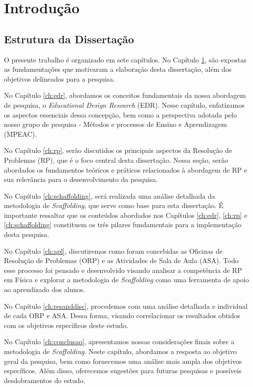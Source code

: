 \chapter{Introdução}\label{ch:intro}

\section{Estrutura da Dissertação}

O presente trabalho é organizado em sete capítulos. No Capítulo \ref{ch:intro}, são expostas as fundamentações que motivaram a elaboração desta dissertação, além dos objetivos delineados para a pesquisa.

No Capítulo \ref{ch:edr}, abordamos os conceitos fundamentais da nossa abordagem de pesquisa, o \textit{Educational Design Research} (EDR). Nesse capítulo, enfatizamos os aspectos essenciais dessa concepção, bem como a perspectiva adotada pelo nosso grupo de pesquisa - Métodos e processos de Ensino e Aprendizagem (MPEAC).

No Capítulo \ref{ch:rp}, serão discutidos os principais aspectos da Resolução de Problemas (RP), que é o foco central desta dissertação. Nessa seção, serão abordados os fundamentos teóricos e práticos relacionados à abordagem de RP e sua relevância para o desenvolvimento da pesquisa.

No Capítulo \ref{ch:schaffolding}, será realizada uma análise detalhada da metodologia de \textit{Scaffolding}, que serve como base para esta dissertação. É importante ressaltar que os conteúdos abordados nos Capítulos \ref{ch:edr}, \ref{ch:rp} e \ref{ch:schaffolding} constituem os três pilares fundamentais para a implementação desta pesquisa.

No Capítulo \ref{ch:apl}, discutiremos como foram concebidas as Oficinas de Resolução de Problemas (ORP) e as Atividades de Sala de Aula (ASA). Todo esse processo foi pensado e desenvolvido visando analisar a competência de RP em Física e explorar a metodologia de \textit{Scaffolding} como uma ferramenta de apoio ao aprendizado dos alunos.

No Capítulo \ref{ch:resanddisc}, procedemos com uma análise detalhada e individual de cada ORP e ASA. Dessa forma, visando correlacionar os resultados obtidos com os objetivos específicos deste estudo. 

No Capítulo \ref{ch:conclusao}, apresentamos nossas considerações finais sobre a metodologia de \textit{Scaffolding}. Neste capítulo, abordamos a resposta ao objetivo geral da pesquisa, bem como fornecemos uma análise mais ampla dos objetivos específicos. Além disso, oferecemos sugestões para futuras pesquisas e possíveis desdobramentos do estudo.

